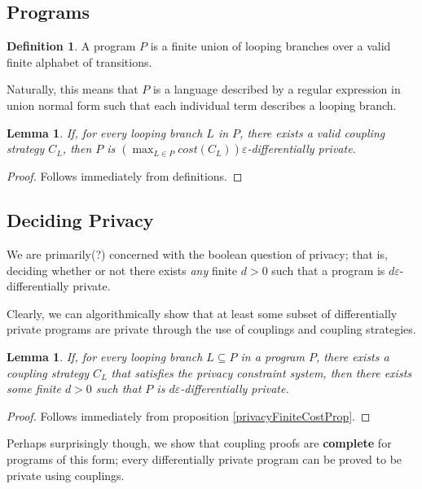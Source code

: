 \documentclass[12pt]{article}
\newtheorem{lemma}[thm]{Lemma}
\theoremstyle{definition}
\newtheorem{defn}[thm]{Definition}
\begin{document}
\subsection{Programs}

\begin{defn}
    A program $P$ is a finite union of looping branches over a valid finite alphabet of transitions. 
\end{defn}

Naturally, this means that $P$ is a language described by a regular expression in union normal form such that each individual term describes a looping branch. 

\begin{lemma}
    If, for every looping branch $L$ in $P$, there exists a valid coupling strategy $C_L$, then $P$ is $(\max_{L\in P} cost(C_L))\varepsilon$-differentially private. 
\end{lemma}
\begin{proof}
    Follows immediately from definitions. 
\end{proof}

\subsection{Deciding Privacy}

We are primarily(?) concerned with the boolean question of privacy; that is, deciding whether or not there exists \textit{any} finite $d>0$ such that a program is $d\varepsilon$-differentially private. 

Clearly, we can algorithmically show that at least some subset of differentially private programs are private through the use of couplings and coupling strategies. 

\begin{lemma}
    If, for every looping branch $L\subseteq P$ in a program $P$, there exists a coupling strategy $C_L$ that satisfies the privacy constraint system, then there exists some finite $d>0$ such that $P$ is $d\varepsilon$-differentially private.    
\end{lemma}
\begin{proof}
    Follows immediately from proposition \ref{privacyFiniteCostProp}.
\end{proof}

Perhaps surprisingly though, we show that coupling proofs are \textbf{complete} for programs of this form; every differentially private program can be proved to be private using couplings. 
\end{document}
